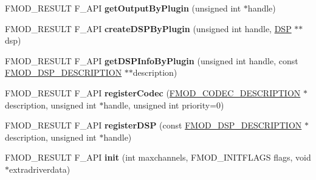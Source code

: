 \begin{DoxyCompactItemize}
\item 
\hypertarget{class_f_m_o_d_1_1_system_a4fc02b0d0253fb9c16427393d25bad59}{F\+M\+O\+D\+\_\+\+R\+E\+S\+U\+L\+T F\+\_\+\+A\+P\+I {\bfseries get\+Output\+By\+Plugin} (unsigned int $\ast$handle)}\label{class_f_m_o_d_1_1_system_a4fc02b0d0253fb9c16427393d25bad59}

\item 
\hypertarget{class_f_m_o_d_1_1_system_a3b6b43cfc7eced0c0babf56403d91f6f}{F\+M\+O\+D\+\_\+\+R\+E\+S\+U\+L\+T F\+\_\+\+A\+P\+I {\bfseries create\+D\+S\+P\+By\+Plugin} (unsigned int handle, \hyperlink{class_f_m_o_d_1_1_d_s_p}{D\+S\+P} $\ast$$\ast$dsp)}\label{class_f_m_o_d_1_1_system_a3b6b43cfc7eced0c0babf56403d91f6f}

\item 
\hypertarget{class_f_m_o_d_1_1_system_ade2dc1c4b0ce419ade897ad06ee524a4}{F\+M\+O\+D\+\_\+\+R\+E\+S\+U\+L\+T F\+\_\+\+A\+P\+I {\bfseries get\+D\+S\+P\+Info\+By\+Plugin} (unsigned int handle, const \hyperlink{struct_f_m_o_d___d_s_p___d_e_s_c_r_i_p_t_i_o_n}{F\+M\+O\+D\+\_\+\+D\+S\+P\+\_\+\+D\+E\+S\+C\+R\+I\+P\+T\+I\+O\+N} $\ast$$\ast$description)}\label{class_f_m_o_d_1_1_system_ade2dc1c4b0ce419ade897ad06ee524a4}

\item 
\hypertarget{class_f_m_o_d_1_1_system_af2d0ac8c44aa4ac6f4ba67e6004dcad6}{F\+M\+O\+D\+\_\+\+R\+E\+S\+U\+L\+T F\+\_\+\+A\+P\+I {\bfseries register\+Codec} (\hyperlink{struct_f_m_o_d___c_o_d_e_c___d_e_s_c_r_i_p_t_i_o_n}{F\+M\+O\+D\+\_\+\+C\+O\+D\+E\+C\+\_\+\+D\+E\+S\+C\+R\+I\+P\+T\+I\+O\+N} $\ast$description, unsigned int $\ast$handle, unsigned int priority=0)}\label{class_f_m_o_d_1_1_system_af2d0ac8c44aa4ac6f4ba67e6004dcad6}

\item 
\hypertarget{class_f_m_o_d_1_1_system_aafa782d22d2647a52acb59ff2d8b37ce}{F\+M\+O\+D\+\_\+\+R\+E\+S\+U\+L\+T F\+\_\+\+A\+P\+I {\bfseries register\+D\+S\+P} (const \hyperlink{struct_f_m_o_d___d_s_p___d_e_s_c_r_i_p_t_i_o_n}{F\+M\+O\+D\+\_\+\+D\+S\+P\+\_\+\+D\+E\+S\+C\+R\+I\+P\+T\+I\+O\+N} $\ast$description, unsigned int $\ast$handle)}\label{class_f_m_o_d_1_1_system_aafa782d22d2647a52acb59ff2d8b37ce}

\item 
\hypertarget{class_f_m_o_d_1_1_system_a0f8f7c5f25875362ff9d822ca894857a}{F\+M\+O\+D\+\_\+\+R\+E\+S\+U\+L\+T F\+\_\+\+A\+P\+I {\bfseries init} (int maxchannels, F\+M\+O\+D\+\_\+\+I\+N\+I\+T\+F\+L\+A\+G\+S flags, void $\ast$extradriverdata)}\label{class_f_m_o_d_1_1_system_a0f8f7c5f25875362ff9d822ca894857a}


\end{DoxyCompactItemize}

